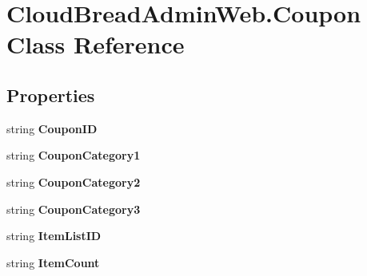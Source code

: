 \hypertarget{class_cloud_bread_admin_web_1_1_coupon}{}\section{Cloud\+Bread\+Admin\+Web.\+Coupon Class Reference}
\label{class_cloud_bread_admin_web_1_1_coupon}
\subsection*{Properties}
\begin{DoxyCompactItemize}
\item 
string {\bfseries Coupon\+ID}\hypertarget{class_cloud_bread_admin_web_1_1_coupon_a00ef24076e2d2f7de93782d96ea876b0}{}\label{class_cloud_bread_admin_web_1_1_coupon_a00ef24076e2d2f7de93782d96ea876b0}

\item 
string {\bfseries Coupon\+Category1}\hypertarget{class_cloud_bread_admin_web_1_1_coupon_a53445be4ae15a2211a6646740d4f5460}{}\label{class_cloud_bread_admin_web_1_1_coupon_a53445be4ae15a2211a6646740d4f5460}

\item 
string {\bfseries Coupon\+Category2}\hypertarget{class_cloud_bread_admin_web_1_1_coupon_a40901c1efae043606bf3f842518c90d0}{}\label{class_cloud_bread_admin_web_1_1_coupon_a40901c1efae043606bf3f842518c90d0}

\item 
string {\bfseries Coupon\+Category3}\hypertarget{class_cloud_bread_admin_web_1_1_coupon_a276a5a5df1f271efe95dc75bfa64a2fc}{}\label{class_cloud_bread_admin_web_1_1_coupon_a276a5a5df1f271efe95dc75bfa64a2fc}

\item 
string {\bfseries Item\+List\+ID}\hypertarget{class_cloud_bread_admin_web_1_1_coupon_a3062bc65d83596bdc042f897719bd503}{}\label{class_cloud_bread_admin_web_1_1_coupon_a3062bc65d83596bdc042f897719bd503}

\item 
string {\bfseries Item\+Count}\hypertarget{class_cloud_bread_admin_web_1_1_coupon_ac20e7c5e435b933c334b2ea1092bb0f1}{}\label{class_cloud_bread_admin_web_1_1_coupon_ac20e7c5e435b933c334b2ea1092bb0f1}


\end{DoxyCompactItemize}
